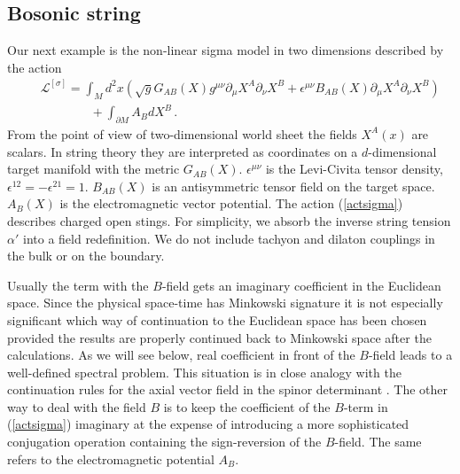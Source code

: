 \subsection{Bosonic string}\label{s3string}
Our next example is the non-linear sigma model in two dimensions
described by the action
\begin{eqnarray}&&
\mathcal{L}^{[\sigma]}=\int_M d^2 x\left(
\sqrt{g} G_{AB}(X) g^{\mu\nu}
\partial_\mu X^A \partial_\nu X^B +
\epsilon^{\mu\nu} B_{AB}(X) \partial_\mu X^A \partial_\nu X^B \right)
\nonumber\\
&&\qquad\qquad +\int_{\partial M} A_BdX^B\,.
\label{actsigma}
\end{eqnarray}
From the point of view of two-dimensional world sheet the fields
$X^A(x)$ are scalars. In string theory they are interpreted as
coordinates on a $d$-dimensional target manifold with the metric $G_{AB}(X)$.
$\epsilon^{\mu\nu}$ is the Levi-Civita tensor density, 
$\epsilon^{12}=-\epsilon^{21}=1$.
$B_{AB}(X)$ is an antisymmetric tensor field on the target space.
$A_B(X)$ is the electromagnetic vector potential. The action 
(\ref{actsigma}) describes charged open stings. For simplicity,
we absorb the inverse string tension $\alpha'$ into a field redefinition.
We do not include tachyon and dilaton couplings in the bulk or on the
boundary.

Usually the term with the $B$-field gets an imaginary coefficient
in the Euclidean space. Since the physical space-time has Minkowski
signature it is not especially significant which way of continuation
to the Euclidean space has been chosen provided the results are
properly continued back to Minkowski space after the calculations.
As we will see below, real coefficient in front of the $B$-field leads
to a well-defined spectral problem. This situation is in close
analogy with the continuation rules for the axial vector
field in the spinor determinant \cite{Andrianov:1984qj,Andrianov:1984fg}.
The other way to deal with the field $B$ is to keep the coefficient
of the $B$-term in (\ref{actsigma}) imaginary at the expense
of introducing a more sophisticated conjugation operation 
\cite{Osborn:1991gm} containing the sign-reversion of the
$B$-field. The same refers to the electromagnetic potential $A_B$.

